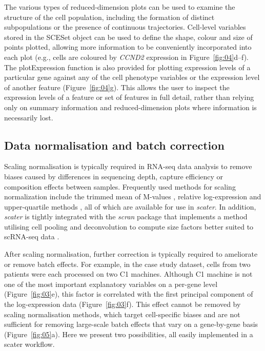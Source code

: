 \documentclass{bioinfo}
\begin{document}
The various types of reduced-dimension plots can be used to examine the structure of the cell population, including the formation of distinct subpopulations or the presence of continuous trajectories. Cell-level variables stored in the
SCESet object can be used to define the shape, colour and size of points
plotted, allowing more information to be conveniently incorporated into
each plot (e.g., cells are coloured by \emph{CCND2} expression in
Figure~\ref{fig:04}d--f). The plotExpression function is also provided for
plotting expression levels of a particular gene against any of the cell
phenotype variables or the expression level of
another feature (Figure~\ref{fig:04}g). This allows the user to inspect the expression levels
of a feature or set of features in full detail, rather than relying only
on summary information and reduced-dimension plots where information is
necessarily lost.


\subsection{Data normalisation and batch correction} \label{data-normalisation-and-batch-correction}

Scaling normalisation is typically required in RNA-seq data analysis to remove biases caused by differences in sequencing depth, capture efficiency or composition effects between samples. Frequently used methods for scaling normalization include the trimmed mean of M-values \citep{Robinson2010-dy}, relative log-expression \citep{Anders2010-kv} and upper-quartile methods \citep{Bullard2010-ui}, all of which are available for use in \emph{scater}. In addition, \emph{scater} is tightly integrated with the \emph{scran} package that implements a method utilising cell pooling and deconvolution to compute size factors better suited to scRNA-seq data \citep{Lun2016-sk}.

After scaling normalisation, further correction is typically required to ameliorate or remove batch effects. For example, in the case study dataset, cells from two patients were each processed on two C1 machines. Although C1 machine is not one of the most important explanatory variables on a per-gene level (Figure~\ref{fig:03}e), this factor is correlated with the first principal component of the log-expression data (Figure~\ref{fig:03}f). This effect cannot be removed by scaling normalisation methods, which target cell-specific biases and are not sufficient for removing large-scale batch effects that vary on a gene-by-gene basis (Figure~\ref{fig:05}a). Here we present two possibilities, all easily implemented in a scater workflow.
\end{document}
